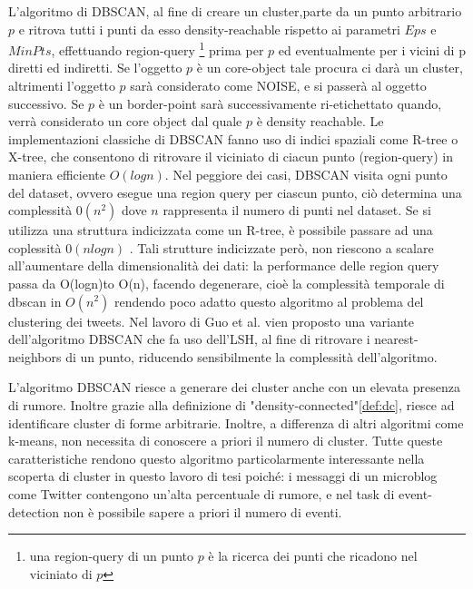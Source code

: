L'algoritmo di DBSCAN, al fine di creare un cluster,parte da un punto arbitrario $p$ e ritrova tutti i punti da esso density-reachable rispetto ai parametri $Eps$ e $MinPts$, effettuando region-query \footnote{una region-query  di un punto $p$ è la ricerca dei punti che ricadono nel viciniato di $p$} prima per $p$ ed eventualmente per i vicini di p diretti ed indiretti.
Se l'oggetto $p$ è un core-object tale procura ci darà un cluster, altrimenti l'oggetto $p$ sarà considerato come NOISE, e si passerà al oggetto successivo. Se $p$ è un border-point sarà successivamente ri-etichettato quando, verrà considerato un core object dal quale $p$ è density reachable.
Le implementazioni classiche di DBSCAN fanno uso di indici spaziali come R-tree o X-tree, che consentono di ritrovare il viciniato di ciacun punto (region-query) in maniera efficiente $O(logn)$. Nel peggiore dei casi, DBSCAN visita ogni punto del dataset, ovvero esegue una region query per ciascun punto, ciò determina una complessità $0(n^2)$  dove $n$ rappresenta il numero di punti nel dataset. Se si utilizza una struttura indicizzata come un R-tree, è possibile passare ad una coplessità $0(nlogn)$ . 
Tali strutture indicizzate però, non riescono a scalare all'aumentare della dimensionalità dei dati: la performance delle region query passa da  O(logn)to O(n), facendo degenerare, cioè la complessità temporale di dbscan in $O(n^2)$ rendendo poco adatto questo algoritmo al problema del clustering dei tweets. Nel lavoro di Guo et al. \cite{4370588} vien proposto una variante dell'algoritmo DBSCAN che fa uso dell'LSH, al fine di ritrovare i nearest-neighbors di un punto, riducendo sensibilmente la complessità dell'algoritmo.
 
L'algoritmo DBSCAN riesce  a generare dei cluster anche con un elevata presenza di rumore. Inoltre grazie alla definizione di "density-connected"\ref{def:dc}, riesce ad identificare cluster di forme arbitrarie. Inoltre, a differenza di altri algoritmi come k-means, non necessita di conoscere a priori il numero di cluster. Tutte queste caratteristiche rendono questo algoritmo particolarmente interessante nella scoperta di cluster in questo lavoro di tesi poiché: i messaggi di un microblog come Twitter contengono un'alta percentuale di rumore, e nel task di event-detection non è possibile sapere a priori il numero di eventi.
